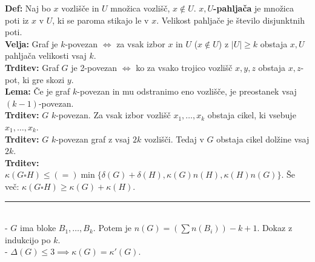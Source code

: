 \documentclass[a4paper,10pt]{article}
\theoremstyle{definition}
\let\oldtextbf\textbf
\renewcommand{\textbf}[1]{\oldtextbf{\boldmath #1}}
\newcommand{\rlsep}{\rule{0.5 \textwidth}{.1pt}}
\begin{document}
\textbf{Def:} Naj bo $x$ vozlišče in $U$ množica vozlišč, $x \notin U$. \textbf{$x, U$-pahljača} je množica poti iz $x$ v $U$, ki se paroma stikajo le v $x$. Velikost pahljače je število disjunktnih poti.\\
\textbf{Velja:} Graf je $k$-povezan $\iff$ za vsak izbor $x$ in $U$ ($x \notin U$) z $|U| \geq k$ obstaja $x, U$ pahljača velikosti vsaj $k$.\\
\textbf{Trditev:} Graf $G$ je 2-povezan $\iff$ ko za vsako trojico vozlišč $x, y, z$ obstaja $x, z$-pot, ki gre skozi $y$.\\
\textbf{Lema:} Če je graf $k$-povezan in mu odstranimo eno vozlišče, je preostanek vsaj $(k-1)$-povezan.\\
\textbf{Trditev:} $G$ $k$-povezan. Za vsak izbor vozlišč $x_1, \ldots, x_k$ obstaja cikel, ki vsebuje $x_1, \ldots, x_k$.\\
\textbf{Trditev:} $G$ $k$-povezan graf z vsaj $2k$ vozlišči. Tedaj v $G$ obstaja cikel dolžine vsaj $2k$.\\
\textbf{Trditev:} $\kappa(G \square H) \leq (=) \min\{\delta(G) + \delta(H), \kappa(G) n(H), \kappa(H) n(G)\}$. Še več: $\kappa(G \square H) \geq \kappa(G) + \kappa(H)$.\\
\rlsep\\
- $G$ ima bloke $B_1, \ldots, B_k$. Potem je $n(G) = (\sum n(B_i)) - k + 1$. Dokaz z indukcijo po $k$.\\
- $\Delta(G) \leq 3 \implies \kappa(G) = \kappa'(G).$


\end{document}
